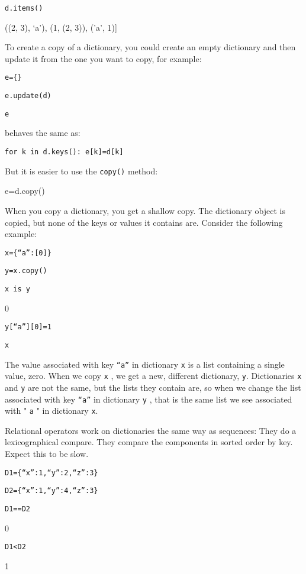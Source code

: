 \texttt{d.items()}

((2, 3), `a'), (1, (2, 3)),
('a', 1){]}

To create a copy of a dictionary,
you could create an empty dictionary and then update it from the one you
want to copy, for example:


\texttt{e=\{\}}


\texttt{e.update(d)}


\texttt{e}




behaves the same as:


\texttt{for k in d.keys(): e{[}k{]}=d{[}k{]}}

But it is easier to use the
\texttt{copy()} method:

e=d.copy()

When you copy a dictionary, you
get a shallow copy. The dictionary object is copied, but none of the
keys or values it contains are. Consider the following example:


\texttt{x=\{``a'':{[}0{]}\}}


\texttt{y=x.copy()}


\texttt{x is y}

0


\texttt{y{[}``a''{]}{[}0{]}=1}


\texttt{x}



The value associated with key
\texttt{``a''} in dictionary \texttt{x} is a list containing a single value,
zero. When we copy \texttt{x} , we get a new, different dictionary,
\texttt{y}. Dictionaries \texttt{x} and \texttt{y} are not the same, but the
lists they contain are, so when we change the list associated with key
\texttt{``a''} in dictionary \texttt{y} , that is the same list we see
associated with " \texttt{a} " in dictionary \texttt{x}.

Relational operators work on
dictionaries the same way as sequences: They do a lexicographical
compare. They compare the components in sorted order by key. Expect this
to be slow.


\texttt{D1=\{``x'':1,``y'':2,``z'':3\}}


\texttt{D2=\{``x'':1,``y'':4,``z'':3\}}


\texttt{D1==D2}

0


\texttt{D1\textless{}D2}

1

\subsection[Strings]{}

